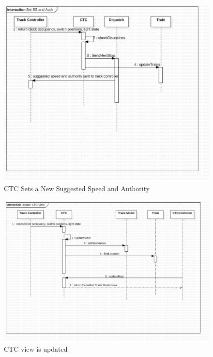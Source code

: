 \documentclass{article}
\begin{document}
     \begin{figure}[H]
        \centering
        \includegraphics[width=\textwidth]{./CTC/Set_SS_and_Auth.png}
        \caption{CTC Sets a New Suggested Speed and Authority}
        \label{fig:Use Case: CTC Sets a New Suggested Speed and Authority}
    \end{figure}
     \begin{figure}[H]
        \centering
        \includegraphics[width=\textwidth]{./CTC/Update_CTC_View.png}
        \caption{CTC view is updated}
        \label{fig:Use Case: CTC view is updated}
    \end{figure}
\end{document}
